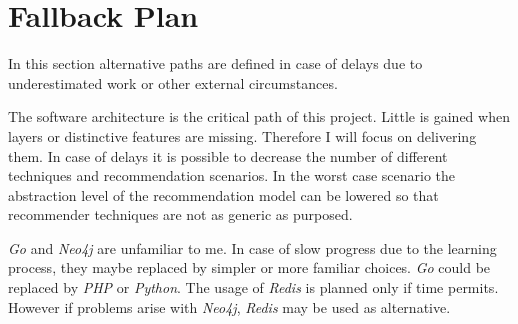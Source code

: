 \section{Fallback Plan}

In this section alternative paths are defined in case of delays due to underestimated work or other external circumstances.

The software architecture is the critical path of this project. Little is gained when layers or distinctive features are missing. Therefore I will focus on delivering them. In case of delays it is possible to decrease the number of different techniques and recommendation scenarios. In the worst case scenario the abstraction level of the recommendation model can be lowered so that recommender techniques are not as generic as purposed.

\emph{Go} and \emph{Neo4j} are unfamiliar to me. In case of slow progress due to the learning process, they maybe replaced by simpler or more familiar choices. \emph{Go} could be replaced by \emph{PHP} or \emph{Python}. The usage of \emph{Redis} is planned only if time permits. However if problems arise with \emph{Neo4j}, \emph{Redis} may be used as alternative.